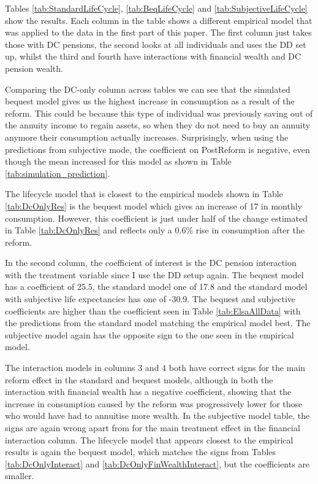 \documentclass[12pt]{article}
\begin{document}
Tables \ref{tab:StandardLifeCycle}, \ref{tab:BeqLifeCycle} and
\ref{tab:SubjectiveLifeCycle} show the results. Each column in the table shows a
different empirical model that was applied to the data in the first part of this
paper. The first column just takes those with DC pensions, the second looks at
all individuals and uses the DD set up, whilst the third and fourth have
interactions with financial wealth and DC pension wealth.

Comparing the DC-only column across tables we can see that the simulated bequest
model gives us the highest increase in consumption as a result of the reform.
This could be because this type of individual was previously saving out of the
annuity income to regain assets, so when they do not need to buy an annuity
anymore their consumption actually increases. Surprisingly, when using the predictions from
subjective mode, the coefficient on PostReform is negative, even though the mean
increased for this model as shown in Table \ref{tab:simulation_prediction}.

The lifecycle model that is closest to the empirical models shown in Table
\ref{tab:DcOnlyRes} is the bequest model which gives an increase of 17 in
monthly consumption. However, this coefficient is just under half of the change
estimated in Table \ref{tab:DcOnlyRes} and reflects only a 0.6\% rise in
consumption after the reform.

In the second column, the coefficient of interest is the DC pension interaction
with the treatment variable since I use the DD setup again. The bequest model
has a coefficient of 25.5, the standard model one of 17.8 and the standard model
with subjective life expectancies has one of -30.9. The bequest and subjective
coefficients are higher than the coefficient seen in Table \ref{tab:ElsaAllData}
with the predictions from the standard model matching the empirical model best.
The subjective model again has the opposite sign to the one seen in the
empirical model.

The interaction models in columns 3 and 4 both have correct signs for the main
reform effect in the standard and bequest models, although in both the
interaction with financial wealth has a negative coefficient, showing that the
increase in consumption caused by the reform was progressively lower for those
who would have had to annuitise more wealth. In the subjective model table, the
signs are again wrong apart from for the main treatment effect in the financial
interaction column. The lifecycle model that appears closest to the empirical
results is again the bequest model, which matches the signs from Tables
\ref{tab:DcOnlyInteract} and \ref{tab:DcOnlyFinWealthInteract}, but the
coefficients are smaller.
\end{document}
